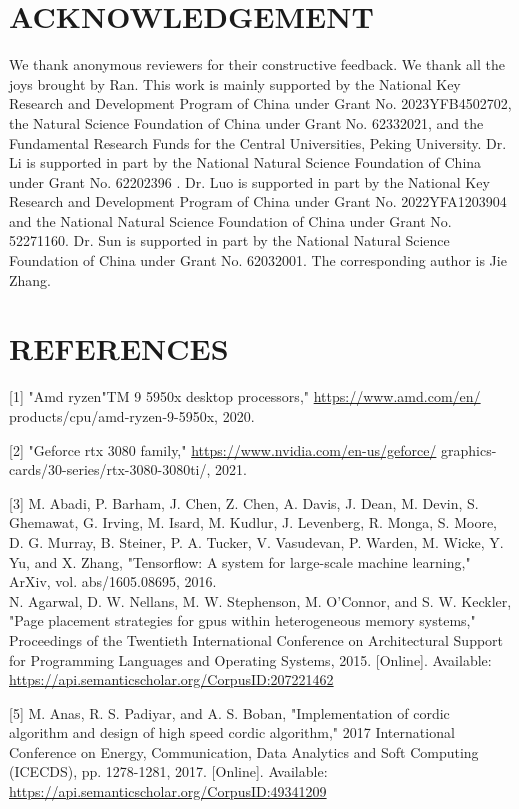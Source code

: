 \documentclass[10pt]{article}
\begin{document}
\section*{ACKNOWLEDGEMENT}
We thank anonymous reviewers for their constructive feedback. We thank all the joys brought by Ran. This work is mainly supported by the National Key Research and Development Program of China under Grant No. 2023YFB4502702, the Natural Science Foundation of China under Grant No. 62332021, and the Fundamental Research Funds for the Central Universities, Peking University. Dr. Li is supported in part by the National Natural Science Foundation of China under Grant No. 62202396 . Dr. Luo is supported in part by the National Key Research and Development Program of China under Grant No. 2022YFA1203904 and the National Natural Science Foundation of China under Grant No. 52271160. Dr. Sun is supported in part by the National Natural Science Foundation of China under Grant No. 62032001. The corresponding author is Jie Zhang.

\section*{REFERENCES}
[1] "Amd ryzen"TM 9 5950x desktop processors," \href{https://www.amd.com/en/}{https://www.amd.com/en/} products/cpu/amd-ryzen-9-5950x, 2020.

[2] "Geforce rtx 3080 family," \href{https://www.nvidia.com/en-us/geforce/}{https://www.nvidia.com/en-us/geforce/} graphics-cards/30-series/rtx-3080-3080ti/, 2021.

[3] M. Abadi, P. Barham, J. Chen, Z. Chen, A. Davis, J. Dean, M. Devin, S. Ghemawat, G. Irving, M. Isard, M. Kudlur, J. Levenberg, R. Monga, S. Moore, D. G. Murray, B. Steiner, P. A. Tucker, V. Vasudevan, P. Warden, M. Wicke, Y. Yu, and X. Zhang, "Tensorflow: A system for large-scale machine learning," ArXiv, vol. abs/1605.08695, 2016.\\
[4] N. Agarwal, D. W. Nellans, M. W. Stephenson, M. O'Connor, and S. W. Keckler, "Page placement strategies for gpus within heterogeneous memory systems," Proceedings of the Twentieth International Conference on Architectural Support for Programming Languages and Operating Systems, 2015. [Online]. Available: \href{https://api.semanticscholar.org/CorpusID:207221462}{https://api.semanticscholar.org/CorpusID:207221462}

[5] M. Anas, R. S. Padiyar, and A. S. Boban, "Implementation of cordic algorithm and design of high speed cordic algorithm," 2017 International Conference on Energy, Communication, Data Analytics and Soft Computing (ICECDS), pp. 1278-1281, 2017. [Online]. Available: \href{https://api.semanticscholar.org/CorpusID:49341209}{https://api.semanticscholar.org/CorpusID:49341209}
\end{document}

